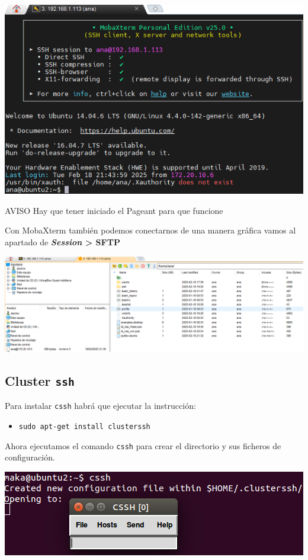 \documentclass[11pt]{article}
\begin{document}
\begin{center}
\includegraphics[width=.9\linewidth]{./media/mobaxterm-2.png}
\end{center}

\begin{alertblock}{AVISO}
Hay que tener iniciado el Pageant para que funcione
\end{alertblock}

Con MobaXterm también podemos conectarnos de una manera gráfica vamos al apartado de \textbf{\emph{Session} > SFTP}

\begin{center}
\includegraphics[width=.9\linewidth]{./media/mobaxterm-3.png}
\end{center}
\subsection{Cluster \texttt{ssh}}
\label{sec:orgcd7c026}
Para instalar \texttt{cssh} habrá que ejecutar la instrucción:
\begin{itemize}
\item \texttt{sudo apt-get install clusterssh}
\end{itemize}

Ahora ejecutamos el comando \texttt{cssh} para crear el directorio y sus ficheros de configuración.

\begin{center}
\includegraphics[width=.9\linewidth]{./media/cssh-1.png}
\end{center}
\end{document}
